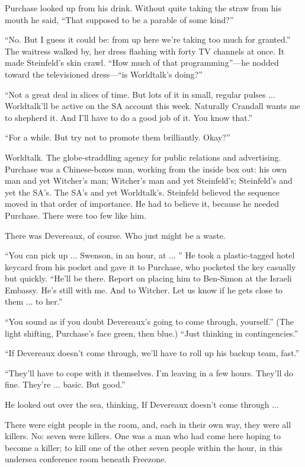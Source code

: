 Purchase looked up from his drink. Without quite taking the straw from his mouth he said, ``That supposed to be a parable of some kind?''

``No. But I guess it could be: from up here we're taking too much for granted.'' The waitress walked by, her dress flashing with forty TV channels at once. It made Steinfeld's skin crawl. ``How much of that programming''—he nodded toward the televisioned dress—``is Worldtalk's doing?''

``Not a great deal in slices of time. But lots of it in small, regular pulses ... Worldtalk'll be active on the SA account this week. Naturally Crandall wants me to shepherd it. And I'll have to do a good job of it. You know that.''

``For a while. But try not to promote them brilliantly. Okay?''

Worldtalk. The globe-straddling agency for public relations and advertising. Purchase was a Chinese-boxes man, working from the inside box out: his own man and yet Witcher's man; Witcher's man and yet Steinfeld's; Steinfeld's and yet the SA's. The SA's and yet Worldtalk's. Steinfeld believed the sequence moved in that order of importance. He had to believe it, because he needed Purchase. There were too few like him.

There was Devereaux, of course. Who just might be a waste.

``You can pick up ... Swenson, in an hour, at ... '' He took a plastic-tagged hotel keycard from his pocket and gave it to Purchase, who pocketed the key casually but quickly. ``He'll be there. Report on placing him to Ben-Simon at the Israeli Embassy. He's still with me. And to Witcher. Let us know if he gets close to them ... to her.''

``You sound as if you doubt Devereaux's going to come through, yourself.'' (The light shifting, Purchase's face green, then blue.) ``Just thinking in contingencies.''

``If Devereaux doesn't come through, we'll have to roll up his backup team, fast.''

``They'll have to cope with it themselves. I'm leaving in a few hours. They'll do fine. They're ... basic. But good.''

He looked out over the sea, thinking, If Devereaux doesn't come through ...

There were eight people in the room, and, each in their own way, they were all killers. No: seven were killers. One was a man who had come here hoping to become a killer; to kill one of the other seven people within the hour, in this undersea conference room beneath Freezone.

